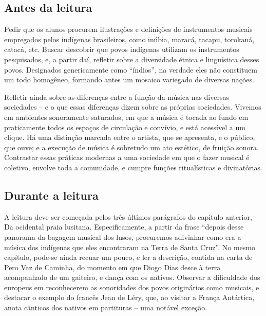 \documentclass[11pt]{extarticle}
\begin{document}
\subsection{Antes da leitura}

Pedir que os alunos procurem ilustrações e definições de instrumentos musicais
empregados pelos indígenas brasileiros, como inúbia, maracá, tacapu, torokaná,
catacá, etc. Buscar descobrir que povos indígenas utilizam os instrumentos
pesquisados, e, a partir daí, refletir sobre a diversidade étnica e linguística
desses povos. Designados genericamente como “índios”, na verdade eles não
constituem um todo homogêneo, formando antes um mosaico variegado de diversas
nações.


Refletir ainda sobre as diferenças entre a função da música nas diversas
sociedades – e o que essas diferenças dizem sobre as próprias sociedades.
Vivemos em ambientes sonoramente saturados, em que a música é tocada ao fundo
em praticamente todos os espaços de circulação e convívio, e está acessível a
um clique. Há uma distinção marcada entre o artista, que se apresenta, e o
público, que ouve; e a execução de música é sobretudo um ato estético, de
fruição sonora. Contrastar essas práticas modernas a uma sociedade em que o
fazer musical é coletivo, envolve toda a comunidade, e cumpre funções
ritualísticas e divinatórias.

\subsection{Durante a leitura}

  A leitura deve ser começada pelos três últimos parágrafos do capítulo
anterior, Da ocidental praia lusitana. Especificamente, a partir da frase
“depois desse panorama da bagagem musical dos lusos, procuremos adivinhar como
era a música dos indígenas que eles encontraram na Terra de Santa Cruz”. No
mesmo capítulo, pode-se ainda recuar um pouco, e ler a descrição, contida na
carta de Pero Vaz de Caminha, do momento em que Diogo Dias desce à terra
acompanhado de um gaiteiro, e dança com os nativos. Observar a dificuldade dos
europeus em reconhecerem as sonoridades dos povos originários como musicais, e
destacar o exemplo do francês Jean de Léry, que, ao visitar a França Antártica,
anota cânticos dos nativos em partituras – uma notável exceção.
\end{document}
